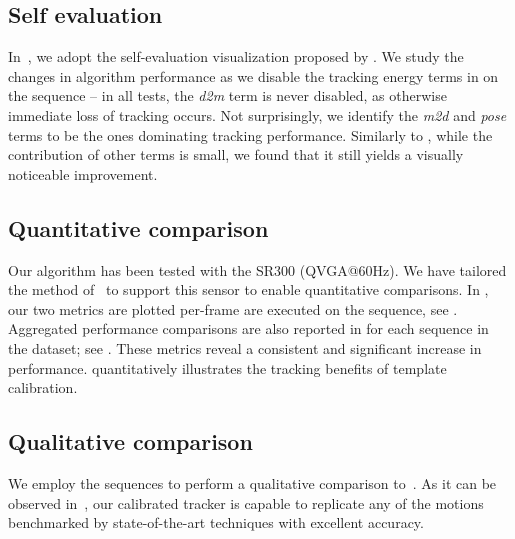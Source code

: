 

\subsection*{Self evaluation}
% 
In~, we adopt the self-evaluation visualization proposed by \cite{taylor2016joint}. We study the changes in algorithm performance as we disable the tracking energy terms in  on the  sequence -- in all tests, the \emph{d2m} term is never disabled, as otherwise immediate loss of tracking occurs. Not surprisingly, we identify the \emph{m2d} and \emph{pose} terms to be the ones dominating tracking performance.
Similarly to \cite{taylor2016joint}, while the contribution of other terms is small, we found that it still yields a visually noticeable improvement.

\subsection*{Quantitative comparison}
Our algorithm has been tested with the \realsense{} SR300 (QVGA@60Hz).  We have tailored the method of~\cite{tagliasacchi2015robust} to support this sensor to enable quantitative comparisons. In , our two metrics are plotted per-frame  are executed on the  sequence,  see \VideoHTrack{}. 
Aggregated performance comparisons are also reported in  for each sequence in the \handy{} dataset; see \VideoExtra{}. These metrics reveal a consistent and significant increase in performance.  quantitatively illustrates the tracking benefits of template calibration.

\subsection*{Qualitative comparison}
We employ the \handy{} sequences to perform a qualitative comparison to~\cite{qian2014realtime,sridhar2015fast,sharp2015accurate,taylor2016joint}. As it can be observed in~\VideoExtra{}, our calibrated tracker is capable to replicate any of the motions benchmarked by state-of-the-art techniques with excellent accuracy.

